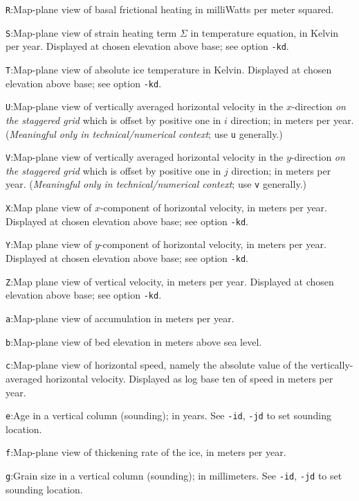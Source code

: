 \documentclass[11pt,final]{amsart}
\begin{document}
\verb|R|:\quad Map-plane view of basal frictional heating in milliWatts per meter squared.

\verb|S|:\quad Map-plane view of strain heating term $\Sigma$ in temperature equation, in Kelvin per year.  Displayed at chosen elevation above base; see option \verb|-kd|.

\verb|T|:\quad Map-plane view of absolute ice temperature in Kelvin.  Displayed at chosen elevation above base; see option \verb|-kd|.

\verb|U|:\quad Map-plane view of vertically averaged horizontal velocity in the $x$-direction \emph{on the staggered grid} which is offset by positive one in $i$ direction;  in meters per year.  (\emph{Meaningful only in technical/numerical context}; use \verb|u| generally.)

\verb|V|:\quad Map-plane view of vertically averaged horizontal velocity in the $y$-direction \emph{on the staggered grid} which is offset by positive one in $j$ direction;  in meters per year.  (\emph{Meaningful only in technical/numerical context}; use \verb|v| generally.)

\verb|X|:\quad Map plane view of $x$-component of horizontal velocity, in meters per year.  Displayed at chosen elevation above base; see option \verb|-kd|.

\verb|Y|:\quad Map plane view of $y$-component of horizontal velocity, in meters per year.  Displayed at chosen elevation above base; see option \verb|-kd|.

\verb|Z|:\quad Map plane view of vertical velocity, in meters per year.  Displayed at chosen elevation above base; see option \verb|-kd|.

\verb|a|:\quad Map-plane view of accumulation in meters per year.

\verb|b|:\quad Map-plane view of bed elevation in meters above sea level.

\verb|c|:\quad Map-plane view of horizontal speed, namely the absolute value of the vertically-averaged horizontal velocity.  Displayed as log base ten of speed in meters per year.

\verb|e|:\quad Age in a vertical column (sounding); in years.  See \verb|-id|, \verb|-jd| to set sounding location.

\verb|f|:\quad Map-plane view of thickening rate of the ice, in meters per year.

\verb|g|:\quad Grain size in a vertical column (sounding); in millimeters.  See \verb|-id|, \verb|-jd| to set sounding location.
\end{document}
